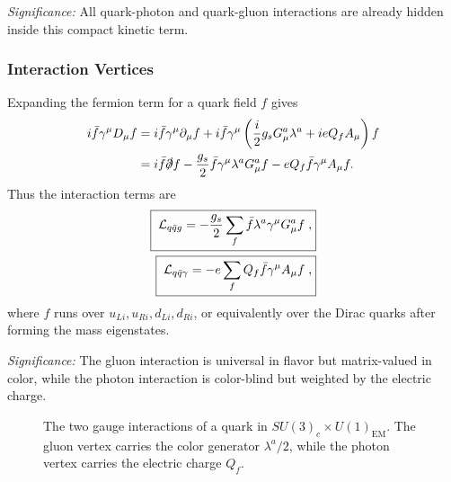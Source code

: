 \textit{Significance:} All quark-photon and quark-gluon interactions are already hidden inside this compact kinetic term.

\subsubsection*{Interaction Vertices}

Expanding the fermion term for a quark field $f$ gives
\begin{align}
  i\bar f\gamma^\mu D_\mu f
  &=i\bar f\gamma^\mu\partial_\mu f
    +i\bar f\gamma^\mu
       \left(\frac{i}{2}g_sG_\mu^a\lambda^a+i e Q_f A_\mu\right)f
      \notag\\
  &=i\bar f\slashed\partial f
    -\frac{g_s}{2}\bar f\gamma^\mu\lambda^aG_\mu^a f
    -eQ_f\bar f\gamma^\mu A_\mu f .
  \label{eq:lec15:fermion_covariant_expansion}
\end{align}
Thus the interaction terms are
\begin{align}
  \boxed{\;\mathcal{L}_{q\bar q g}
  =-\frac{g_s}{2}\sum_f\bar f\lambda^a\gamma^\mu G_\mu^a f\; ,}
  \label{eq:lec15:quark_gluon_vertex_lagrangian}\\
  \boxed{\;\mathcal{L}_{q\bar q\gamma}
  =-e\sum_f Q_f\bar f\gamma^\mu A_\mu f\; ,}
  \label{eq:lec15:quark_photon_vertex_lagrangian}
\end{align}
where $f$ runs over $u_{Li},u_{Ri},d_{Li},d_{Ri}$, or equivalently over the Dirac quarks after forming the mass eigenstates.

\textit{Significance:} The gluon interaction is universal in flavor but matrix-valued in color, while the photon interaction is color-blind but weighted by the electric charge.

\begin{figure}[ht]
\centering
{}
\hspace{1.2cm}
\caption{The two gauge interactions of a quark in $SU(3)_c\times U(1)_{\mathrm{EM}}$. The gluon vertex carries the color generator $\lambda^a/2$, while the photon vertex carries the electric charge $Q_f$.}
\label{fig:lec15:qcd-qed-quark-vertices}
\end{figure}

